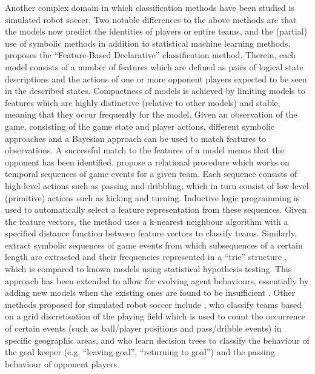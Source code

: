 \documentclass[final,1p,times,authoryear]{elsarticle}
\begin{document}
Another complex domain in which classification methods have been studied is simulated robot soccer. Two notable differences to the above methods are that the models now predict the identities of players or entire teams, and the (partial) use of symbolic methods in addition to statistical machine learning methods. \citet{s2004} proposes the ``Feature-Based Declarative'' classification method. Therein, each model consists of a number of features which are defined as pairs of logical state descriptions and the actions of one or more opponent players expected to be seen in the described states. Compactness of models is achieved by limiting models to features which are highly distinctive (relative to other models) and stable, meaning that they occur frequently for the model. Given an observation of the game, consisting of the game state and player actions, different symbolic approaches and a Bayesian approach can be used to match features to observations. A successful match to the features of a model means that the opponent has been identified. \citet{bdfe2010} propose a relational procedure which works on temporal sequences of game events for a given team. Each sequence consists of high-level actions such as passing and dribbling, which in turn consist of low-level (primitive) actions such as kicking and turning. Inductive logic programming \citep{m1991} is used to automatically select a feature representation from these sequences. Given the feature vectors, the method uses a k-nearest neighbour algorithm with a specified distance function between feature vectors to classify teams. Similarly, \citet{ilsk2008} extract symbolic sequences of game events from which subsequences of a certain length are extracted and their frequencies represented in a ``trie'' structure \citep{f1960}, which is compared to known models using statistical hypothesis testing. This approach has been extended to allow for evolving agent behaviours, essentially by adding new models when the existing ones are found to be insufficient \citep{ials2010}. Other methods proposed for simulated robot soccer include \citet{rv2000}, who classify teams based on a grid discretisation of the playing field which is used to count the occurrence of certain events (such as ball/player positions and pass/dribble events) in specific geographic areas, and \citet{vw2002} who learn decision trees to classify the behaviour of the goal keeper (e.g. ``leaving goal'', ``returning to goal'') and the passing behaviour of opponent players.
\end{document}
